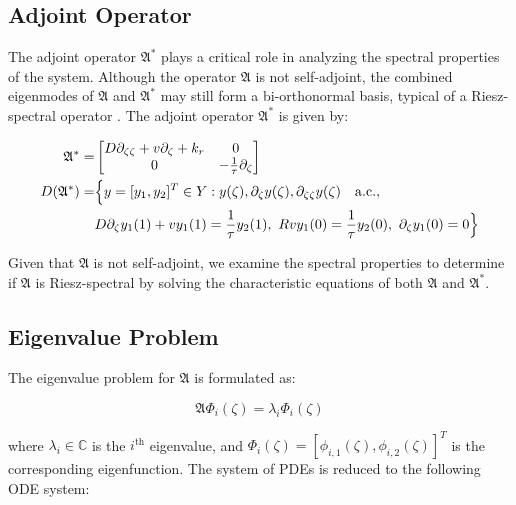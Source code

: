 \subsection{Adjoint Operator}

The adjoint operator $\mathfrak{A}^*$ plays a critical role in analyzing the spectral properties of the system. Although the operator $\mathfrak{A}$ is not self-adjoint, the combined eigenmodes of $\mathfrak{A}$ and $\mathfrak{A}^*$ may still form a bi-orthonormal basis, typical of a Riesz-spectral operator \autocite{curtainbook}. The adjoint operator $\mathfrak{A}^*$ is given by:

\begin{equation} \label{eq:adjoint_A}
    \begin{aligned}
        {\mathfrak{A}}^{*} =&
        \begin{bmatrix}
            D \partial_{\zeta \zeta} + v \partial_\zeta +k_r & 0\\
            0 & -\frac{1}{\tau} \partial_\zeta
        \end{bmatrix}\\
        D(\mathfrak{A}^*) =& \Bigl\{ y = [y_1, y_2]^T \in Y:
        y(\zeta), \partial_\zeta y(\zeta), \partial_{\zeta \zeta} y(\zeta) \quad \mathrm{a.c.},\\
        &D \partial_\zeta y_1(1) + v y_1(1) = \frac{1}{\tau} y_2(1),\ R v y_1(0) = \frac{1}{\tau} y_2(0),\ \partial_\zeta y_1(0) = 0 \Bigr\}
    \end{aligned}
\end{equation}

Given that $\mathfrak{A}$ is not self-adjoint, we examine the spectral properties to determine if $\mathfrak{A}$ is Riesz-spectral by solving the characteristic equations of both $\mathfrak{A}$ and $\mathfrak{A}^*$.

\subsection{Eigenvalue Problem}

The eigenvalue problem for $\mathfrak{A}$ is formulated as:

\begin{equation} \label{eq:eig_prob}
        \mathfrak{A} \Phi_i(\zeta) = \lambda_i \Phi_i(\zeta)
\end{equation}

where $\lambda_i \in \mathbb{C}$ is the $i^{\text{th}}$ eigenvalue, and $\Phi_i(\zeta) = [\phi_{i,1}(\zeta), \phi_{i,2}(\zeta)]^T$ is the corresponding eigenfunction. The system of PDEs is reduced to the following ODE system:

